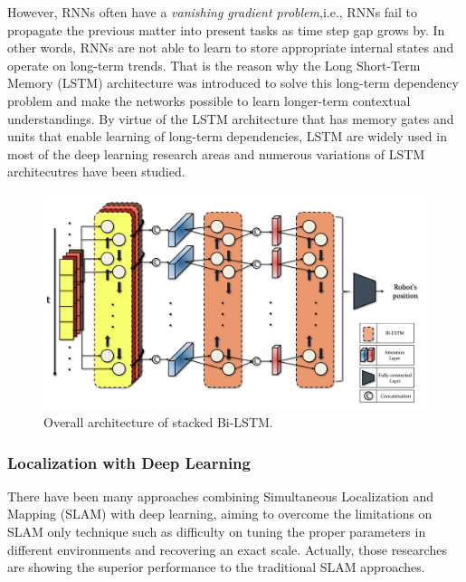 \documentclass[letterpaper, 10 pt, conference]{ieeeconf}  %
\begin{document}
However, RNNs often have a \textit{vanishing gradient problem},i.e., RNNs fail to propagate the previous matter into present tasks as time step gap grows by. In other words, RNNs are not able to learn to store appropriate internal states and operate on long-term trends. That is the reason why the Long Short-Term Memory (LSTM) architecture was introduced to solve this long-term dependency problem and make the networks possible to learn longer-term contextual understandings\cite{hochreiter1997long}.
By virtue of the LSTM architecture that has memory gates and units that enable learning of long-term dependencies\cite{zaremba2014learning}, LSTM are widely used in most of the deep learning research areas and numerous variations of LSTM architecutres have been studied.

\begin{figure}[ht]
	
	\centering
	\includegraphics[height=10 cm]{CE554_networks}
	
	\label{fig:example}
	
	\caption{Overall architecture of stacked Bi-LSTM. }
	
\end{figure}


\subsubsection{Localization with Deep Learning}
There have been many approaches combining Simultaneous Localization and Mapping (SLAM) with deep learning, aiming to overcome the limitations on SLAM only technique such as difficulty on tuning the proper parameters in different environments and recovering an exact scale. Actually, those researches are showing the superior performance to the traditional SLAM approaches.
\end{document}
